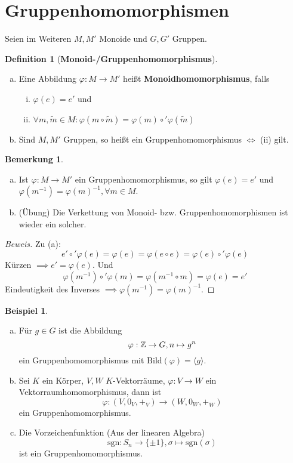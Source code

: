 \documentclass[a4paper]{article}
\theoremstyle{plain}
\theoremstyle{definition}
\newtheorem{defi}[thm]{Definition}
\newtheorem{bem}[thm]{Bemerkung}
\newtheorem{bsp}[thm]{Beispiel}
\begin{document}
\section{Gruppenhomomorphismen}%
\label{sec:Gruppenhomomorphismen}
Seien im Weiteren $M, M'$ Monoide und $G, G'$ Gruppen.
\begin{defi}[\textbf{Monoid-/Gruppenhomomorphismus}] \item
  \begin{enumerate}[(a)]
    \item Eine Abbildung $\varphi : M \to M'$ heißt \textbf{Monoidhomomorphismus}, falls
          \begin{enumerate}[(i)]
            \item $\varphi(e) = e'$ und
                  \item $\forall m , \tilde m \in M : \varphi(m \circ \tilde m) = \varphi(m) \circ' \varphi(\tilde m)$
          \end{enumerate}
          \item Sind $M, M'$ Gruppen, so heißt ein Gruppenhomomorphismus $\iff$ (ii) gilt.
  \end{enumerate}
\end{defi}
\begin{bem} \item
 \begin{enumerate}[(a)]
   \item Ist $\varphi : M \to M'$ ein Gruppenhomomorphismus, so gilt $\varphi(e)=e'$ und $\varphi(m^{-1}) = \varphi(m)^{-1}, \forall m \in M$.
         \item (Übung) Die Verkettung von Monoid- bzw. Gruppenhomomorphismen ist wieder ein solcher.
 \end{enumerate}
 \begin{proof}[Beweis]
Zu (a): $$e' \circ' \varphi(e) = \varphi(e) = \varphi(e \circ e) = \varphi(e) \circ' \varphi(e)$$
Kürzen $\implies e' = \varphi(e)$. Und $$\varphi(m^{-1})\circ' \varphi(m) = \varphi(m^{-1} \circ m) = \varphi(e) = e'$$
Eindeutigkeit des Inverses $\implies \varphi(m^{-1}) = \varphi(m)^{-1}$.
 \end{proof}
\end{bem}
\begin{bsp}
  \begin{enumerate}[(a)]
    \item Für $g \in G$ ist die Abbildung
          $$\varphi: \Bbb Z \to G, n \mapsto g^{n}$$
          ein Gruppenhomomorphismus mit $\mathrm{Bild}(\varphi) = \langle g \rangle$.
    \item Sei $K$ ein Körper, $V, W$ $K$-Vektorräume, $\varphi : V \to W$ ein Vektorraumhomomorphismus, dann ist
          $$\varphi : (V, 0_{V}, +_{V}) \to (W, 0_{W}, +_{W})$$
          ein Gruppenhomomorphismus.
    \item Die Vorzeichenfunktion (Aus der linearen Algebra)
          $$\mathrm{sgn}: S_{n} \to \{\pm 1\}, \sigma \mapsto \mathrm{sgn}(\sigma)$$
          ist ein Gruppenhomomorphismus.
  \end{enumerate}
\end{bsp}
\end{document}
